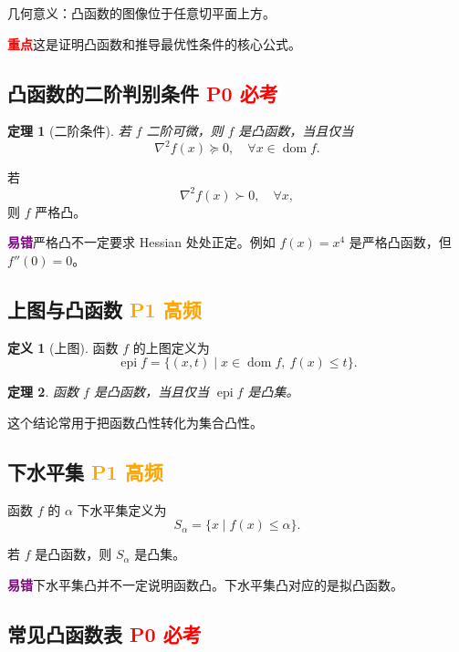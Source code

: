 \documentclass[11pt,a4paper]{ctexart}
\newcommand{\dom}{\operatorname{dom}}
\newcommand{\epi}{\operatorname{epi}}
\newcommand{\Pzero}{\textcolor{red}{\textbf{P0 必考}}}
\newcommand{\Pone}{\textcolor{orange}{\textbf{P1 高频}}}
\newcommand{\key}{\textcolor{red}{\textbf{重点}}}
\newcommand{\warn}{\textcolor{purple}{\textbf{易错}}}
\theoremstyle{definition}
\newtheorem{definition}{定义}[section]
\theoremstyle{plain}
\newtheorem{theorem}{定理}[section]
\theoremstyle{remark}
\begin{document}
几何意义：凸函数的图像位于任意切平面上方。

\key{这是证明凸函数和推导最优性条件的核心公式。}

\subsection{凸函数的二阶判别条件 \Pzero}

\begin{theorem}[二阶条件]
若 $f$ 二阶可微，则 $f$ 是凸函数，当且仅当
\[
    \nabla^2 f(x)\succeq0,\quad \forall x\in\dom f.
\]
\end{theorem}

若
\[
    \nabla^2 f(x)\succ0,\quad \forall x,
\]
则 $f$ 严格凸。

\warn{严格凸不一定要求 Hessian 处处正定。例如 $f(x)=x^4$ 是严格凸函数，但 $f''(0)=0$。}

\subsection{上图与凸函数 \Pone}

\begin{definition}[上图]
函数 $f$ 的上图定义为
\[
    \epi f
    =
    \{(x,t)\mid x\in\dom f,\ f(x)\le t\}.
\]
\end{definition}

\begin{theorem}
函数 $f$ 是凸函数，当且仅当 $\epi f$ 是凸集。
\end{theorem}

这个结论常用于把函数凸性转化为集合凸性。

\subsection{下水平集 \Pone}

函数 $f$ 的 $\alpha$ 下水平集定义为
\[
    S_\alpha=\{x\mid f(x)\le\alpha\}.
\]

若 $f$ 是凸函数，则 $S_\alpha$ 是凸集。

\warn{下水平集凸并不一定说明函数凸。下水平集凸对应的是拟凸函数。}

\subsection{常见凸函数表 \Pzero}
\end{document}
